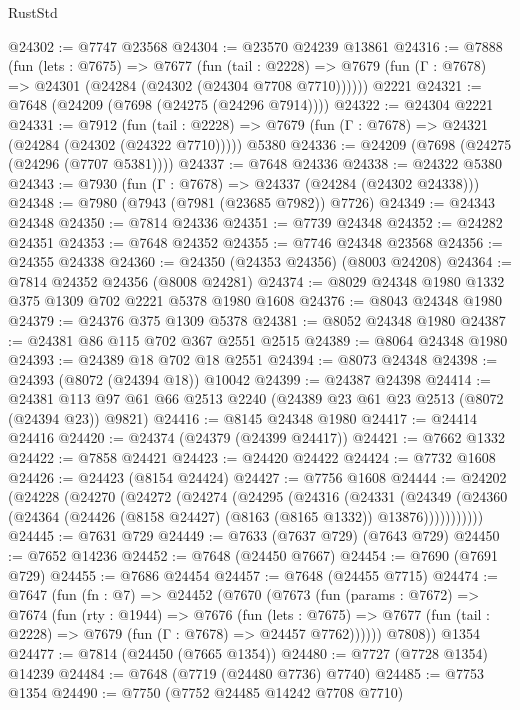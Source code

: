 \begin{lexlean}{RustStd}
\begin{coremodule}
@24302 := @7747 @23568
@24304 := @23570 @24239 @13861
@24316 := @7888
    (fun (lets : @7675) =>
    @7677
      (fun (tail : @2228) =>
      @7679 (fun (Γ : @7678) => @24301 (@24284 (@24302 (@24304 @7708 @7710))))))
    @2221
@24321 := @7648 (@24209 (@7698 (@24275 (@24296 @7914))))
@24322 := @24304 @2221
@24331 := @7912
    (fun (tail : @2228) => @7679 (fun (Γ : @7678) => @24321 (@24284 (@24302 (@24322 @7710)))))
    @5380
@24336 := @24209 (@7698 (@24275 (@24296 (@7707 @5381))))
@24337 := @7648 @24336
@24338 := @24322 @5380
@24343 := @7930 (fun (Γ : @7678) => @24337 (@24284 (@24302 @24338)))
@24348 := @7980 (@7943 (@7981 (@23685 @7982)) @7726)
@24349 := @24343 @24348
@24350 := @7814 @24336
@24351 := @7739 @24348
@24352 := @24282 @24351
@24353 := @7648 @24352
@24355 := @7746 @24348 @23568
@24356 := @24355 @24338
@24360 := @24350 (@24353 @24356) (@8003 @24208)
@24364 := @7814 @24352 @24356 (@8008 @24281)
@24374 := @8029 @24348 @1980 @1332 @375 @1309 @702 @2221 @5378 @1980 @1608
@24376 := @8043 @24348 @1980
@24379 := @24376 @375 @1309 @5378
@24381 := @8052 @24348 @1980
@24387 := @24381 @86 @115 @702 @367 @2551 @2515
@24389 := @8064 @24348 @1980
@24393 := @24389 @18 @702 @18 @2551
@24394 := @8073 @24348
@24398 := @24393 (@8072 (@24394 @18)) @10042
@24399 := @24387 @24398
@24414 := @24381 @113 @97 @61 @66 @2513 @2240 (@24389 @23 @61 @23 @2513 (@8072 (@24394 @23)) @9821)
@24416 := @8145 @24348 @1980
@24417 := @24414 @24416
@24420 := @24374 (@24379 (@24399 @24417))
@24421 := @7662 @1332
@24422 := @7858 @24421
@24423 := @24420 @24422
@24424 := @7732 @1608
@24426 := @24423 (@8154 @24424)
@24427 := @7756 @1608
@24444 := @24202
    (@24228
      (@24270
        (@24272
          (@24274
            (@24295
              (@24316
                (@24331
                  (@24349
                    (@24360 (@24364 (@24426 (@8158 @24427) (@8163 (@8165 @1332)) @13876)))))))))))
@24445 := @7631 @729
@24449 := @7633 (@7637 @729) (@7643 @729)
@24450 := @7652 @14236
@24452 := @7648 (@24450 @7667)
@24454 := @7690 (@7691 @729)
@24455 := @7686 @24454
@24457 := @7648 (@24455 @7715)
@24474 := @7647
    (fun (fn : @7) =>
    @24452
      (@7670
        (@7673
          (fun (params : @7672) =>
          @7674
            (fun (rty : @1944) =>
            @7676
              (fun (lets : @7675) =>
              @7677 (fun (tail : @2228) => @7679 (fun (Γ : @7678) => @24457 @7762))))))
        @7808))
    @1354
@24477 := @7814 (@24450 (@7665 @1354))
@24480 := @7727 (@7728 @1354) @14239
@24484 := @7648 (@7719 (@24480 @7736) @7740)
@24485 := @7753 @1354
@24490 := @7750 (@7752 @24485 @14242 @7708 @7710)

\end{coremodule}
\end{lexlean}
